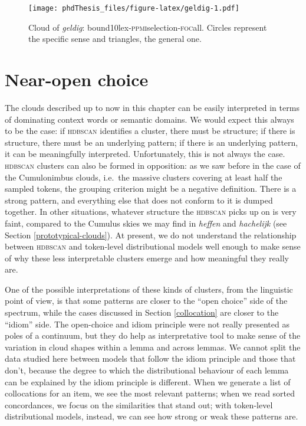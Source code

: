 \documentclass[
]{book}
\begin{document}
\begin{figure}
\centering
\texttt{[image: phdThesis\_files/figure-latex/geldig-1.pdf]}
\caption{\label{fig:geldig}Cloud of \emph{geldig}: bound10lex-\textsc{ppmi}selection-\textsc{foc}all. Circles represent the specific sense and triangles, the general one.}
\end{figure}

\hypertarget{openchoice}{%
\section{Near-open choice}\label{openchoice}}

The clouds described up to now in this chapter can be easily interpreted in terms of dominating context words or semantic domains. We would expect this always to be the case: if \textsc{hdbscan} identifies a cluster, there must be structure; if there is structure, there must be an underlying pattern; if there is an underlying pattern, it can be meaningfully interpreted. Unfortunately, this is not always the case. \textsc{hdbscan} clusters can also be formed in opposition: as we saw before in the case of the Cumulonimbus clouds, i.e.~the massive clusters covering at least half the sampled tokens, the grouping criterion might be a negative definition. There is a strong pattern, and everything else that does not conform to it is dumped together. In other situations, whatever structure the \textsc{hdbscan} picks up on is very faint, compared to the Cumulus skies we may find in \emph{heffen} and \emph{hachelijk} (see Section \ref{prototypical-clouds}). At present, we do not understand the relationship between \textsc{hdbscan} and token-level distributional models well enough to make sense of why these less interpretable clusters emerge and how meaningful they really are.

One of the possible interpretations of these kinds of clusters, from the linguistic point of view, is that some patterns are closer to the ``open choice'' side of the spectrum, while the cases discussed in Section \ref{collocation} are closer to the ``idiom'' side. The open-choice and idiom principle were not really presented as poles of a continuum, but they do help as interpretative tool to make sense of the variation in cloud shapes within a lemma and across lemmas. We cannot split the data studied here between models that follow the idiom principle and those that don't, because the degree to which the distributional behaviour of each lemma can be explained by the idiom principle is different.
When we generate a list of collocations for an item, we see the most relevant patterns; when we read sorted concordances, we focus on the similarities that stand out; with token-level distributional models, instead, we can see how strong or weak these patterns are.
\end{document}
